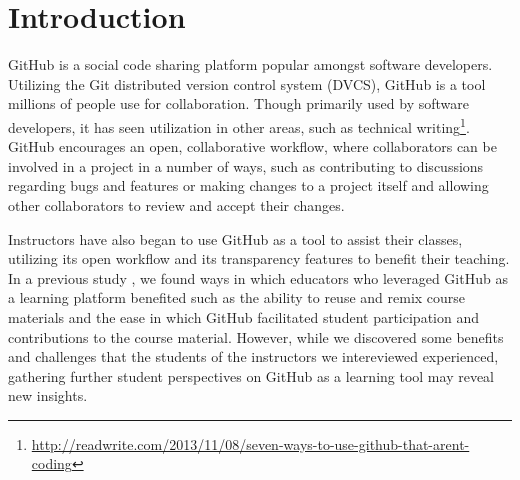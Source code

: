 \section{Introduction}


GitHub is a social code sharing platform popular amongst software developers. Utilizing the Git distributed version control system (DVCS), GitHub is a tool millions of people use for collaboration. Though primarily used by software developers, it has seen utilization in other areas, such as technical writing\footnote{\url{http://readwrite.com/2013/11/08/seven-ways-to-use-github-that-arent-coding}}. GitHub encourages an open, collaborative workflow, where collaborators can be involved in a project in a number of ways, such as contributing to discussions regarding bugs and features or making changes to a project itself and allowing other collaborators to review and accept their changes.

Instructors have also began to use GitHub as a tool to assist their classes, utilizing its open workflow and its transparency features to benefit their teaching. In a previous study \cite{zagalsky2015emergence}, we found ways in which educators who leveraged GitHub as a learning platform benefited such as the ability to reuse and remix course materials and the ease in which GitHub facilitated student participation and contributions to the course material. However, while we discovered some benefits and challenges that the students of the instructors we intereviewed experienced, gathering further student perspectives on GitHub as a learning tool may reveal new insights.




